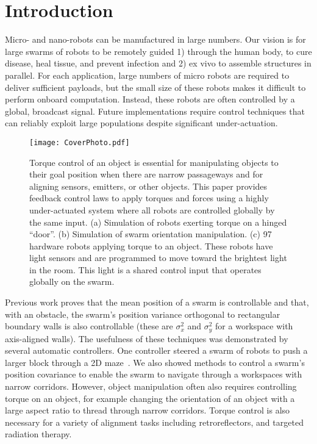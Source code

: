\section{Introduction}\label{sec:Intro}
Micro- and nano-robots can be manufactured in large numbers.
Our vision is for large swarms of robots to be remotely guided 1) through the human body, to cure disease, heal tissue, and prevent infection and 2) ex vivo to assemble structures in parallel. 
 For each application, large numbers of micro robots are required  to deliver sufficient payloads, but the small size of these robots makes it difficult to perform onboard computation.  Instead, these robots are often controlled by a global, broadcast signal. 
 Future implementations require control techniques that can reliably exploit large populations despite significant under-actuation.  
 

\begin{figure}
\begin{center}
	\texttt{[image: CoverPhoto.pdf]}
\end{center}
\vspace{-1em}
\caption{\label{fig:FirstImage}
Torque control of an object is essential for manipulating objects to their goal position  when there are narrow passageways and for aligning sensors, emitters, or other objects. 
This paper provides feedback control laws to apply torques and forces using a highly under-actuated system where all 
robots are controlled globally by the same input. 
(a) Simulation of robots exerting torque on a hinged ``door''.
(b) Simulation of swarm orientation manipulation.
(c) 97 hardware robots applying torque to an object. These robots have light sensors and are programmed to move toward the brightest light in the room.  This light is a shared control input that operates globally on the swarm.
}
\vspace{-1em}
\end{figure}


Previous work proves that the mean position of a swarm is controllable and that, with an obstacle, the swarm's position variance orthogonal to rectangular boundary walls  is also controllable
(these are $\sigma_x^2$ and $\sigma_y^2$ for a workspace with axis-aligned walls). 
The usefulness of these techniques was demonstrated by several automatic controllers. One controller steered a swarm of robots to push a larger block through a 2D maze~\cite{ShahrokhiIROS2015}. 
We also showed methods to control a swarm's position covariance to enable the swarm to navigate through a workspaces with narrow corridors.  
However, object manipulation often also requires controlling torque on an object, for example changing the orientation of an object with a large aspect ratio to thread through narrow corridors.
Torque control  is also necessary for a variety of alignment tasks including retroreflectors, and targeted radiation therapy.

